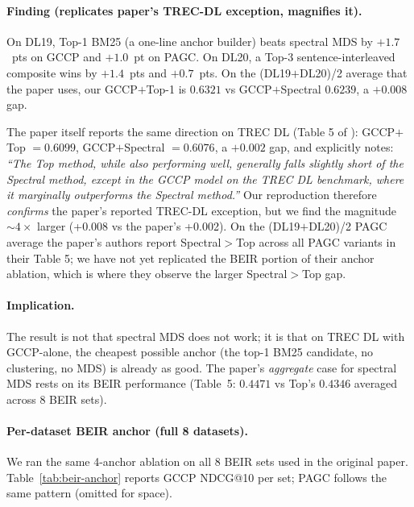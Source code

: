 \documentclass[sigconf]{acmart}
\begin{document}
\paragraph{Finding (replicates paper's TREC-DL exception, magnifies it).}
On DL19, Top-1 BM25 (a one-line anchor builder) beats spectral MDS
by $+1.7$~pts on GCCP and $+1.0$~pt on PAGC. On DL20, a Top-3
sentence-interleaved composite wins by $+1.4$~pts and $+0.7$~pts. On
the (DL19$+$DL20)/2 average that the paper uses, our GCCP$+$Top-1 is
$0.6321$ vs GCCP$+$Spectral $0.6239$, a $+0.008$ gap.

The paper itself reports the same direction on TREC DL (Table 5 of
\cite{long2025precise}): GCCP$+$Top $= 0.6099$, GCCP$+$Spectral
$= 0.6076$, a $+0.002$ gap, and explicitly notes: \emph{``The Top
method, while also performing well, generally falls slightly short
of the Spectral method, except in the GCCP model on the TREC DL
benchmark, where it marginally outperforms the Spectral method.''}
Our reproduction therefore \emph{confirms} the paper's reported
TREC-DL exception, but we find the magnitude $\sim 4\times$ larger
(+0.008 vs the paper's +0.002). On the (DL19$+$DL20)/2 PAGC average
the paper's authors report Spectral$>$Top across all PAGC variants
in their Table 5; we have not yet replicated the BEIR portion of
their anchor ablation, which is where they observe the larger
Spectral$>$Top gap.

\paragraph{Implication.} The result is not that spectral MDS does
not work; it is that on TREC DL with GCCP-alone, the cheapest
possible anchor (the top-1 BM25 candidate, no clustering, no MDS) is
already as good. The paper's \emph{aggregate} case for spectral MDS
rests on its BEIR performance (Table~5: $0.4471$ vs Top's $0.4346$
averaged across 8 BEIR sets).

\paragraph{Per-dataset BEIR anchor (full 8 datasets).} We ran the
same 4-anchor ablation on all 8 BEIR sets used in the original
paper. Table~\ref{tab:beir-anchor} reports GCCP NDCG@10 per set;
PAGC follows the same pattern (omitted for space).
\end{document}
